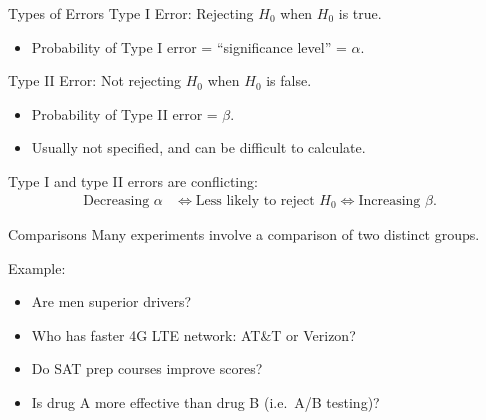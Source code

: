 \documentclass{beamer}
\begin{document}
\begin{frame}{Types of Errors}
Type I Error: Rejecting $H_0$ when $H_0$ is true.
\begin{itemize}
\item Probability of Type I error = ``significance level'' = $\alpha$. 
\end{itemize}

Type II Error: Not rejecting $H_0$  when $H_0$ is false.
\begin{itemize}
\item Probability of Type II error = $\beta$.
\item Usually not specified, and can be difficult to calculate.
\end{itemize}

Type I and type II errors are conflicting:
\begin{align*}
\text{Decreasing }\alpha & \iff \text{Less likely to reject }H_0 
         \iff \text{Increasing }\beta.
\end{align*}
\end{frame}

\begin{frame}{Comparisons}
Many experiments involve a comparison of two distinct groups.

Example:
\begin{itemize}
\item Are men superior drivers?
\item Who has faster 4G LTE network: AT\&T or Verizon?
\item Do SAT prep courses improve scores?
\item Is drug A more effective than drug B (i.e.\ A/B testing)?
\end{itemize}
\end{frame}
\end{document}

